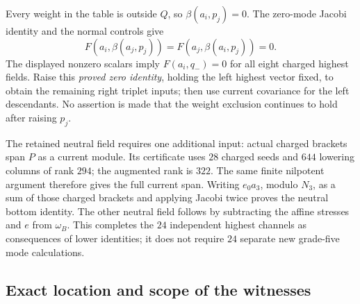 Every weight in the table is outside $Q$, so
$\beta(a_i,p_j)=0$.  The zero-mode Jacobi identity and the normal
controls give
\[
 F(a_i,\beta(a_j,p_j))=F(a_j,\beta(a_i,p_j))=0.
\]
The displayed nonzero scalars imply $F(a_i,q_-)=0$ for all eight
charged highest fields.  Raise this \emph{proved zero identity},
holding the left highest vector fixed, to obtain the remaining
right triplet inputs; then use current covariance for the left
descendants.  No assertion is made that the weight exclusion
continues to hold after raising $p_j$.

The retained neutral field requires one additional input: actual
charged brackets span $P$ as a current module.  Its certificate
uses $28$ charged seeds and $644$ lowering columns of rank $294$;
the augmented rank is $322$.  The same finite nilpotent argument
therefore gives the full current span.  Writing $e_0a_3$, modulo
$N_3$, as a sum of those charged brackets and applying Jacobi
twice proves the neutral bottom identity.  The other neutral
field follows by subtracting the affine stresses and $e$ from
$\omega_B$.  This completes the $24$ independent highest channels
as consequences of lower identities; it does not require $24$
separate new grade-five mode calculations.

\subsection{Exact location and scope of the witnesses}

